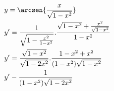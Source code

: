 \begin{ex}
\begin{align}
&y=\arcsen{\frac{x}{\sqrt{1-x^2}}}\nonumber\\
&y'=\frac{1}{\sqrt{1-\frac{x^2}{1-x^2}}}.\frac{\sqrt{1-x^2}+\frac{x^2}{\sqrt{1-x^2}}}{1-x^2}\nonumber\\
&y'=\frac{\sqrt{1-x^2}}{\sqrt{1-2x^2}}.\frac{1-x^2+x^2}{(1-x^2)\sqrt{1-x^2}}\nonumber\\
&y'-\frac{1}{(1-x^2)\sqrt{1-2x^2}}\nonumber
\end{align}
\end{ex}
